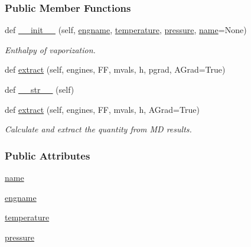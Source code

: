 \subsubsection*{Public Member Functions}
\begin{DoxyCompactItemize}
\item 
def \hyperlink{classsrc_1_1quantity_1_1Quantity__H__vap_af518b7b297e15a80c557139eb5344a11}{\+\_\+\+\_\+init\+\_\+\+\_\+} (self, \hyperlink{classsrc_1_1quantity_1_1Quantity__H__vap_a8c1db25e3ee87b6e39ee094372615763}{engname}, \hyperlink{classsrc_1_1quantity_1_1Quantity_a1f54d5969bb33f67e72bc9ff8c7d6b68}{temperature}, \hyperlink{classsrc_1_1quantity_1_1Quantity_adf325119dc5139a5d664707336bc2e65}{pressure}, \hyperlink{classsrc_1_1quantity_1_1Quantity__H__vap_ac5742c6c1e0adf9829b252c988acb30c}{name}=None)
\begin{DoxyCompactList}\small\item\em Enthalpy of vaporization. \end{DoxyCompactList}\item 
def \hyperlink{classsrc_1_1quantity_1_1Quantity__H__vap_a26a4bbb9c8e627928cb99e87c78e536c}{extract} (self, engines, FF, mvals, h, pgrad, A\+Grad=True)
\item 
def \hyperlink{classsrc_1_1quantity_1_1Quantity_a75f05aea06603e7830b17c4fb4f5264f}{\+\_\+\+\_\+str\+\_\+\+\_\+} (self)
\item 
def \hyperlink{classsrc_1_1quantity_1_1Quantity_a31f14fa77a8312030e07f3be4b797dec}{extract} (self, engines, FF, mvals, h, A\+Grad=True)
\begin{DoxyCompactList}\small\item\em Calculate and extract the quantity from MD results. \end{DoxyCompactList}\end{DoxyCompactItemize}
\subsubsection*{Public Attributes}
\begin{DoxyCompactItemize}
\item 
\hyperlink{classsrc_1_1quantity_1_1Quantity__H__vap_ac5742c6c1e0adf9829b252c988acb30c}{name}
\item 
\hyperlink{classsrc_1_1quantity_1_1Quantity__H__vap_a8c1db25e3ee87b6e39ee094372615763}{engname}
\item 
\hyperlink{classsrc_1_1quantity_1_1Quantity_a1f54d5969bb33f67e72bc9ff8c7d6b68}{temperature}
\item 
\hyperlink{classsrc_1_1quantity_1_1Quantity_adf325119dc5139a5d664707336bc2e65}{pressure}
\end{DoxyCompactItemize}


